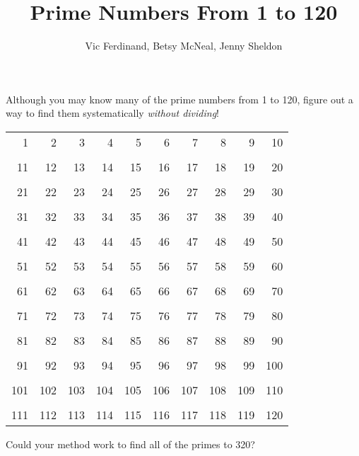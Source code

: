 \documentclass{ximera}
\title{Prime Numbers From 1 to 120}
\author{Vic Ferdinand, Betsy McNeal, Jenny Sheldon}
\begin{document}
\begin{abstract} 
\end{abstract}
\maketitle



\begin{problem}
Although you may know many of the prime numbers from 1 to 120, figure
out a way to find them systematically  \textit{without dividing}!

\vspace*{1cm}

\begin{tabular}{r r r r r r r r r r}

  1 &   2 &   3 &   4 &   5 &   6 &   7 &   8 &   9 &  10\\
  \\
 11 &  12 &  13 &  14 &  15 &  16 &  17 &  18 &  19 &  20\\
 \\
 21 &  22 &  23 &  24 &  25 &  26 &  27 &  28 &  29 &  30\\
 \\
 31 &  32 &  33 &  34 &  35 &  36 &  37 &  38 &  39 &  40\\
 \\
 41 &  42 &  43 &  44 &  45 &  46 &  47 &  48 &  49 &  50\\
 \\
 51 &  52 &  53 &  54 &  55 &  56 &  57 &  58 &  59 &  60\\
 \\
 61 &  62 &  63 &  64 &  65 &  66 &  67 &  68 &  69 &  70\\
 \\
 71 &  72 &  73 &  74 &  75 &  76 &  77 &  78 &  79 &  80\\
 \\
 81 &  82 &  83 &  84 &  85 &  86 &  87 &  88 &  89 &  90\\
 \\
 91 &  92 &  93 &  94 &  95 &  96 &  97 &  98 &  99 & 100\\
 \\
101 & 102 & 103 & 104 & 105 & 106 & 107 & 108 & 109 & 110\\
\\
111 & 112 & 113 & 114 & 115 & 116 & 117 & 118 & 119 & 120\\
\end{tabular}

\end{problem}
\begin{problem}
 Could your method work to find all of the primes to 320?
\end{problem}
\end{document}
